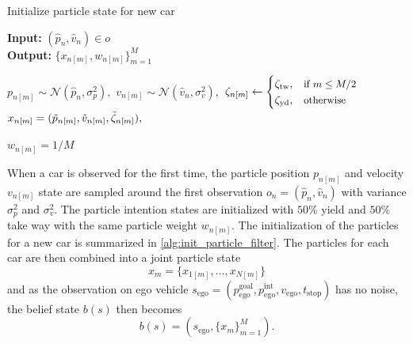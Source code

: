 \begin{algorithm}[t]
    \caption{Initialize particle state for new car }\label{alg:init_particle_filter}
    \hspace*{\algorithmicindent} \textbf{Input:} $(\hat{p}_{n} , \hat{v}_{n} ) \in o$ \\
    \hspace*{\algorithmicindent} \textbf{Output:} $\{x_{n[m]},w_{n[m]}\}^M_{m=1}$ 
   
    \begin{algorithmic}[1]
        \State $p_{n[m]} \sim \mathcal{N}(\hat{p}_{n}, \sigma_p^2),$
        \State $v_{n[m]} \sim \mathcal{N}(\hat{v}_{n}, \sigma_v^2),$
        \State $\zeta_{n[m]} \gets \begin{cases}
                            \zeta_\mathrm{tw}, & \text{\small if $m \leq M/2$}\\
                            \zeta_\mathrm{yd}, & \text{\small otherwise}
                        \end{cases}$
        \State $x_{n[m]} = (\Tilde{p}_{n[m]}, \Tilde{v}_{n[m]}, \Tilde{\zeta}_{n[m]}),$
        
        \State $w_{n[m]}=1/M$
    \EndFor

    \end{algorithmic}
\end{algorithm}
When a car is observed for the first time, the particle position $p_{n[m]}$ and velocity $v_{n[m]}$ state are sampled around the first observation $o_n = (\hat{p}_{n}, \hat{v}_{n} )$ with variance $\sigma_p^2$ and $\sigma_v^2$. The particle intention states are initialized with $50\%$ yield and $50\%$ take way with the same particle weight $w_{n[m]}$. The initialization of the particles for a new car is summarized in \ref{alg:init_particle_filter}. 
The particles for each car are then combined into a joint particle state 
\begin{equation}
    x_{m} = \{x_{1[m]}, \dots, x_{N[m]}\}
    \label{eq:joint_particles}
\end{equation}
and as the observation on ego vehicle $s_\mathrm{ego}=(p_\mathrm{ego}^\mathrm{goal},p_\mathrm{ego}^\mathrm{int}, v_\mathrm{ego}, t_\mathrm{stop})$ has no noise, the belief state $b(s)$ then becomes 
\begin{equation}
    b(s) = (s_\mathrm{ego}, \{x_m\}^M_{m=1}).
    \label{eq:particle_belief_state}
\end{equation}

